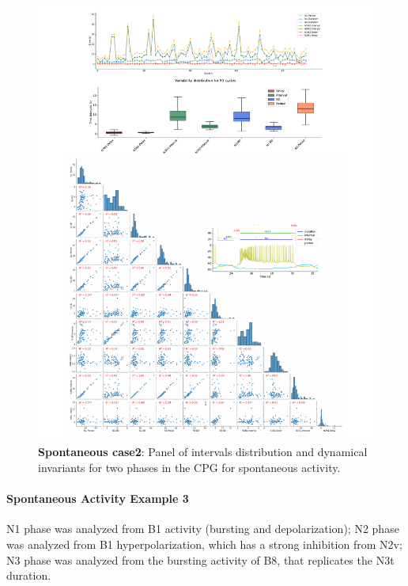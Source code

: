 \begin{figure}[htbp]
\centering
\includegraphics[width=1.1\textwidth]{./invariants/data/SUSSEX/prep2/images/2phases/panel_with_pairplot.pdf}
\caption{\textbf{Spontaneous case2}: Panel of intervals distribution and dynamical invariants for two phases in the CPG for spontaneous activity.}
\label{fig:prep2 2phase invariants pairplot}
\end{figure}


\paragraph{Spontaneous Activity Example 3}
N1 phase was analyzed from B1 activity (bursting and depolarization); N2 phase was analyzed from B1 hyperpolarization, which has a strong inhibition from N2v; N3 phase was analyzed from the bursting activity of B8, that replicates the N3t duration. 

